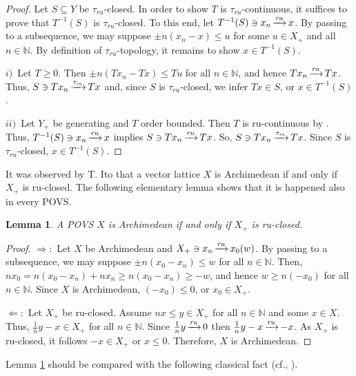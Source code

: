 \documentclass[10pt]{article}
\newtheorem{lemma}{Lemma}[section]
\DeclareMathOperator{\convr}{\xrightarrow[]{{\it ru}}}
\DeclareMathOperator{\convtaur}{\xrightarrow[]{\tau_{{\it ru}}}}
\begin{document}
\begin{proof}
Let $S\subseteq Y$ be $\tau_{ru}$-closed. In order to show $T$ is $\tau_{ru}$-continuous, it suffices to prove that $T^{-1}(S)$ is $\tau_{ru}$-closed.
To this end, let $T^{-1}(S)\ni x_n\convr x$.  By passing to a subsequence, we may suppose 
$\pm n(x_n-x)\leqslant u$ for some $u\in X_+$ and all $n\in\mathbb{N}$. By definition of $\tau_{ru}$-topology,
it remains to show $x\in T^{-1}(S)$.

\smallskip
$i)$\
Let $T\geqslant 0$. Then $\pm n(Tx_n-Tx)\leqslant Tu$ for all $n\in\mathbb{N}$, and hence $Tx_n\convr Tx$. Thus,
$S\ni Tx_n\convtaur Tx$ and, since $S$ is $\tau_{ru}$-closed, we infer $Tx\in S$, or $x\in T^{-1}(S)$.

\smallskip
$ii)$\
Let $Y_+$ be generating and $T$ order bounded. Then $T$ is ru-continuous by \cite[Theorem 2.4~ii)]{EEG-2025}.
Thus, $T^{-1}(S)\ni x_n\convr x$ implies $S\ni Tx_n\convr Tx$. So, $S\ni Tx_n\convtaur Tx$. 
Since $S$ is $\tau_{ru}$-closed, $x\in T^{-1}(S)$.
\end{proof}

It was observed by T. Ito \cite{Ito-1967} that a vector lattice $X$ is Archimedean if and only if $X_+$ is ru-closed. 
The following elementary lemma shows that it is happened also in every POVS.

\begin{lemma}\label{Lemma-2_5}
A POVS $X$ is Archimedean if and only if $X_+$ is ru-closed.
\end{lemma}

\begin{proof}
$\Longrightarrow$:\
Let $X$ be Archimedean and $X_+\ni x_n\convr x_0(w)$. By passing to a subsequence, we may suppose $\pm n(x_0-x_n)\leqslant w$ for all $n\in\mathbb{N}$. Then, 
$nx_0=n(x_0-x_n)+nx_n\geqslant n(x_0-x_n)\geqslant-w$, and hence $w\geqslant n(-x_0)$ for all $n\in\mathbb{N}$. Since $X$  is Archimedean, $(-x_0)\leqslant 0$, or $x_0\in X_+$. 

$\Longleftarrow$:\
Let $X_+$ be ru-closed. Assume $nx\leqslant y\in X_+$ for all $n\in\mathbb{N}$ and some $x\in X$.
Thus, $\frac{1}{n}y-x\in X_+$ for all $n\in\mathbb{N}$. Since $\frac{1}{n}y\convr 0$  
then $\frac{1}{n}y-x\convr-x$. As $X_+$ is ru-closed, it follows $-x\in X_+$ or $x\leqslant 0$. Therefore, $X$ is Archimedean.
\end{proof}

\noindent
Lemma \ref{Lemma-2_5} should be compared with the following classical fact (cf., \cite[Lemma 2.3]{AT-2007}). 
\end{document}
